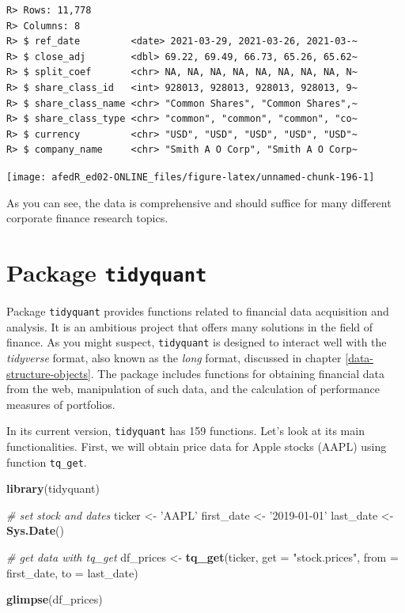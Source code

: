 \documentclass[
  12pt,
]{book}
\newenvironment{Shaded}{\begin{snugshade}}{\end{snugshade}}
\newcommand{\CommentTok}[1]{\textcolor[rgb]{0.37,0.37,0.37}{\textit{#1}}}
\newcommand{\DataTypeTok}[1]{\textcolor[rgb]{0.27,0.27,0.27}{#1}}
\newcommand{\KeywordTok}[1]{\textcolor[rgb]{0.27,0.27,0.27}{\textbf{#1}}}
\newcommand{\NormalTok}[1]{#1}
\newcommand{\StringTok}[1]{\textcolor[rgb]{0.5,0.5,0.5}{#1}}
\begin{document}
\begin{verbatim}
R> Rows: 11,778
R> Columns: 8
R> $ ref_date         <date> 2021-03-29, 2021-03-26, 2021-03-~
R> $ close_adj        <dbl> 69.22, 69.49, 66.73, 65.26, 65.62~
R> $ split_coef       <chr> NA, NA, NA, NA, NA, NA, NA, NA, N~
R> $ share_class_id   <int> 928013, 928013, 928013, 928013, 9~
R> $ share_class_name <chr> "Common Shares", "Common Shares",~
R> $ share_class_type <chr> "common", "common", "common", "co~
R> $ currency         <chr> "USD", "USD", "USD", "USD", "USD"~
R> $ company_name     <chr> "Smith A O Corp", "Smith A O Corp~
\end{verbatim}

\begin{center}\texttt{[image: afedR\_ed02-ONLINE\_files/figure-latex/unnamed-chunk-196-1]} \end{center}

As you can see, the data is comprehensive and should suffice for many different corporate finance research topics.

\hypertarget{package-tidyquant}{%
\section{\texorpdfstring{Package \texttt{tidyquant}}{Package tidyquant}}\label{package-tidyquant}}

Package \texttt{tidyquant} \citep{R-tidyquant} provides functions related to financial data acquisition and analysis. It is an ambitious project that offers many solutions in the field of finance. As you might suspect, \texttt{tidyquant} is designed to interact well with the \emph{tidyverse} format, also known as the \emph{long} format, discussed in chapter \ref{data-structure-objects}. The package includes functions for obtaining financial data from the web, manipulation of such data, and the calculation of performance measures of portfolios. 

In its current version, \texttt{tidyquant} has 159 functions. Let's look at its main functionalities. First, we will obtain price data for Apple stocks (AAPL) using function \texttt{tq\_get}.

\begin{Shaded}
\begin{Highlighting}[]
\KeywordTok{library}\NormalTok{(tidyquant)}

\CommentTok{# set stock and dates}
\NormalTok{ticker <-}\StringTok{ 'AAPL'}
\NormalTok{first_date <-}\StringTok{ '2019-01-01'}
\NormalTok{last_date <-}\StringTok{  }\KeywordTok{Sys.Date}\NormalTok{()}

\CommentTok{# get data with tq_get}
\NormalTok{df_prices <-}\StringTok{ }\KeywordTok{tq_get}\NormalTok{(ticker,}
                    \DataTypeTok{get =} \StringTok{"stock.prices"}\NormalTok{, }
                    \DataTypeTok{from =}\NormalTok{ first_date, }
                    \DataTypeTok{to =}\NormalTok{ last_date)}

\KeywordTok{glimpse}\NormalTok{(df_prices)}
\end{Highlighting}
\end{Shaded}
\end{document}
